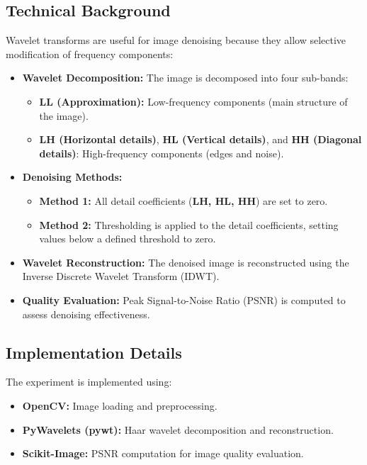 \documentclass[12pt,a4paper]{article}
\begin{document}
\subsection{Technical Background}
Wavelet transforms are useful for image denoising because they allow selective modification of frequency components:
\begin{itemize}
  \item \textbf{Wavelet Decomposition:} The image is decomposed into four sub-bands:
    \begin{itemize}
      \item \textbf{LL (Approximation):} Low-frequency components (main structure of the image).
      \item \textbf{LH (Horizontal details)}, \textbf{HL (Vertical details)}, and \textbf{HH (Diagonal details)}: High-frequency components (edges and noise).
    \end{itemize}
  \item \textbf{Denoising Methods:}
    \begin{itemize}
      \item \textbf{Method 1:} All detail coefficients (\textbf{LH, HL, HH}) are set to zero.
      \item \textbf{Method 2:} Thresholding is applied to the detail coefficients, setting values below a defined threshold to zero.
    \end{itemize}
  \item \textbf{Wavelet Reconstruction:} The denoised image is reconstructed using the Inverse Discrete Wavelet Transform (IDWT).
  \item \textbf{Quality Evaluation:} Peak Signal-to-Noise Ratio (PSNR) is computed to assess denoising effectiveness.
\end{itemize}

\subsection{Implementation Details}
The experiment is implemented using:
\begin{itemize}
  \item \textbf{OpenCV:} Image loading and preprocessing.
  \item \textbf{PyWavelets (pywt):} Haar wavelet decomposition and reconstruction.
  \item \textbf{Scikit-Image:} PSNR computation for image quality evaluation.
\end{itemize}
\end{document}
